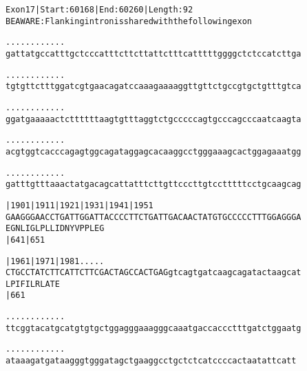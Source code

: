 \documentclass{article}
\begin{document}
\newpage
\begin{alltt}
Exon 17 | Start: 60168 | End: 60260 | Length: 92
BE AWARE: Flanking intron is shared with the following exon

.    .    .    .    .    .    .    .    .    .    .    .    
gattatgccatttgctcccatttcttcttattctttcatttttggggctctccatcttga

.    .    .    .    .    .    .    .    .    .    .    .    
tgtgttctttggatcgtgaacagatccaaagaaaaggttgttctgccgtgctgtttgtca

.    .    .    .    .    .    .    .    .    .    .    .    
ggatgaaaaactcttttttaagtgtttaggtctgcccccagtgcccagcccaatcaagta

.    .    .    .    .    .    .    .    .    .    .    .    
acgtggtcacccagagtggcagataggagcacaaggcctgggaaagcactggagaaatgg

.    .    .    .    .    .    .    .    .    .    .    .    
gatttgtttaaactatgacagcattatttcttgttcccttgtcctttttcctgcaagcag

    |1901     |1911     |1921     |1931     |1941     |1951 
GAAGGGAACCTGATTGGATTACCCCTTCTGATTGACAACTATGTGCCCCCTTTGGAGGGA
E  G  N  L  I  G  L  P  L  L  I  D  N  Y  V  P  P  L  E  G  
                        |641                          |651  

    |1961     |1971     |1981        .    .    .    .    .  
CTGCCTATCTTCATTCTTCGACTAGCCACTGAGgtcagtgatcaagcagatactaagcat
L  P  I  F  I  L  R  L  A  T  E                             
                        |661                                

  .    .    .    .    .    .    .    .    .    .    .    .  
ttcggtacatgcatgtgtgctggagggaaagggcaaatgaccaccctttgatctggaatg

  .    .    .    .    .    .    .    .    .    .    .    . 
ataaagatgataagggtgggatagctgaaggcctgctctcatccccactaatattcatt
\end{alltt}
\newpage
\end{document}
